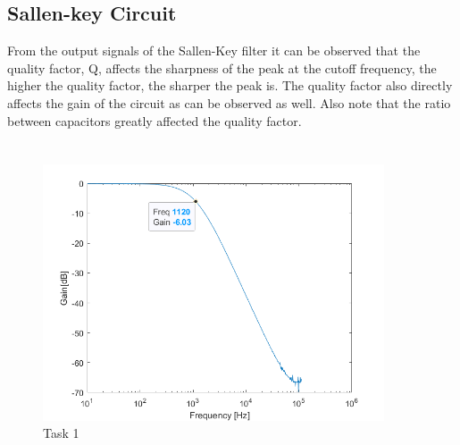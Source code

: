 \documentclass{scrartcl}
\begin{document}
\subsection{Sallen-key Circuit}

From the output signals of the Sallen-Key filter it can be observed that the quality factor, Q, affects the sharpness of the peak at the cutoff frequency, the higher the quality factor, the sharper the peak is. The quality factor also directly affects the gain of the circuit as can be observed as well. Also note that the ratio between capacitors greatly affected the quality factor.


\newpage
\appendix
\section{}

    \begin{figure}[H]
    \begin{center}
    \centering
     \includegraphics[width=0.9\textwidth]{Task1bodegainplot.png}
     \caption{Task 1}
     \label{distorted_signal}
     \end{center}
     \end{figure}
\end{document}
